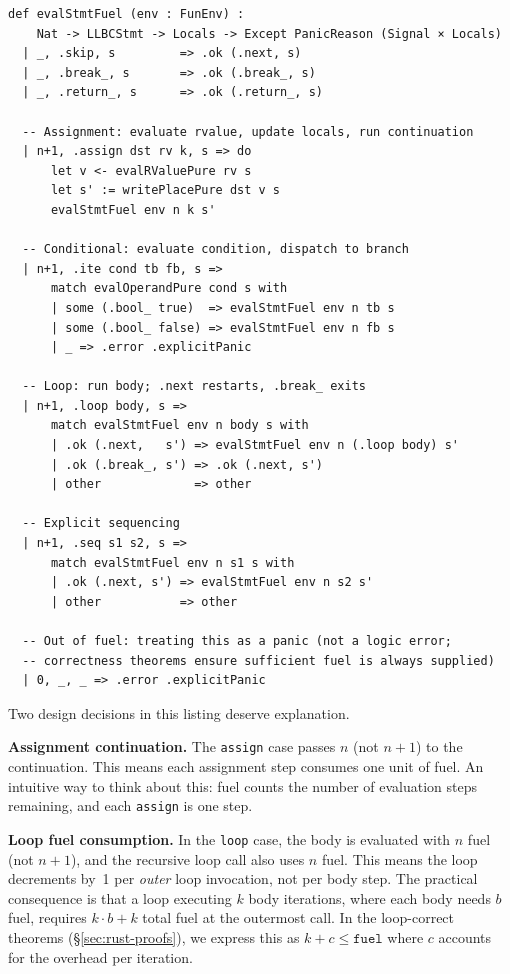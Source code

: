 \begin{lstlisting}[caption={Core interpreter cases (simplified).},label={lst:interp}]
def evalStmtFuel (env : FunEnv) :
    Nat -> LLBCStmt -> Locals -> Except PanicReason (Signal × Locals)
  | _, .skip, s         => .ok (.next, s)
  | _, .break_, s       => .ok (.break_, s)
  | _, .return_, s      => .ok (.return_, s)

  -- Assignment: evaluate rvalue, update locals, run continuation
  | n+1, .assign dst rv k, s => do
      let v <- evalRValuePure rv s
      let s' := writePlacePure dst v s
      evalStmtFuel env n k s'

  -- Conditional: evaluate condition, dispatch to branch
  | n+1, .ite cond tb fb, s =>
      match evalOperandPure cond s with
      | some (.bool_ true)  => evalStmtFuel env n tb s
      | some (.bool_ false) => evalStmtFuel env n fb s
      | _ => .error .explicitPanic

  -- Loop: run body; .next restarts, .break_ exits
  | n+1, .loop body, s =>
      match evalStmtFuel env n body s with
      | .ok (.next,   s') => evalStmtFuel env n (.loop body) s'
      | .ok (.break_, s') => .ok (.next, s')
      | other             => other

  -- Explicit sequencing
  | n+1, .seq s1 s2, s =>
      match evalStmtFuel env n s1 s with
      | .ok (.next, s') => evalStmtFuel env n s2 s'
      | other           => other

  -- Out of fuel: treating this as a panic (not a logic error;
  -- correctness theorems ensure sufficient fuel is always supplied)
  | 0, _, _ => .error .explicitPanic
\end{lstlisting}

Two design decisions in this listing deserve explanation.

\textbf{Assignment continuation.} The \texttt{assign} case passes $n$ (not $n+1$)
to the continuation. This means each assignment step consumes one unit of fuel.
An intuitive way to think about this: fuel counts the number of evaluation
steps remaining, and each \texttt{assign} is one step.

\textbf{Loop fuel consumption.} In the \texttt{loop} case, the body is evaluated
with $n$ fuel (not $n+1$), and the recursive loop call also uses $n$ fuel.
This means the loop decrements by~1 per \emph{outer} loop invocation, not per
body step. The practical consequence is that a loop executing $k$ body iterations,
where each body needs $b$ fuel, requires $k \cdot b + k$ total fuel at the
outermost call. In the loop-correct theorems (\S\ref{sec:rust-proofs}), we
express this as $k + c \le \texttt{fuel}$ where $c$ accounts for the overhead
per iteration.

